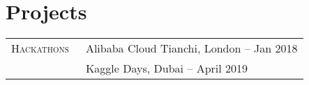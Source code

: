 \documentclass[10pt]{article}
\begin{document}
{{\begin{minipage}[t]{0.5\textwidth}









\section{Projects}

\begin{tabular}{rl}
\textsc{Hackathons~}
& Alibaba Cloud Tianchi, London -- Jan 2018\\
& Kaggle Days, Dubai -- April 2019\\
\end{tabular}\\[10pt]


\end{minipage}}}
\end{document}
